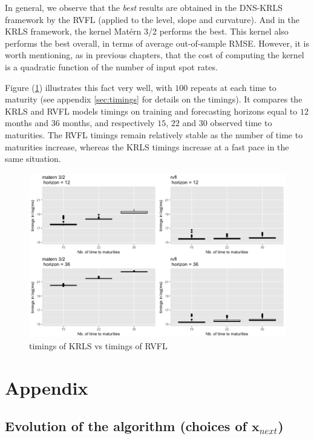 In general, we observe that the \textit{best} results are obtained in the DNS-KRLS framework by the RVFL (applied to the level, slope and curvature). And in the KRLS framework, the kernel Mat\'ern 3/2 performs the best. This kernel also performs the best overall, in terms of average out-of-sample RMSE. However, it is worth mentioning, as in previous chapters, that the cost of computing the kernel is a quadratic function of the number of input spot rates. 

Figure (\ref{timings}) illustrates this fact very well, with $100$ repeats at each time to maturity (see appendix \ref{sec:timings} for details on the timings). It compares the KRLS and RVFL models timings on training and forecasting horizons equal to $12$ months and $36$ months, and respectively $15$, $22$ and $30$ observed time to maturities. The RVFL timings remain relatively stable as the number of time to maturities increase, whereas the KRLS timings increase at a fast pace in the same situation.

\begin{figure}[!htb]
\centering
\includegraphics[width=14cm]{gfx/chapter-bayesianrvfl/timings.png}
\caption{timings of KRLS vs timings of RVFL}
\label{timings}
\end{figure}

\newpage

\section{Appendix}

\subsection{Evolution of the algorithm (choices of $\textbf{x}_{next}$)}
\label{sec:chosen_points}

